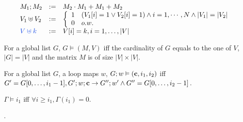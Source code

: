\documentclass[a4paper,11pt]{article}
\begin{document}
\[
\begin{array}{lll}
M_1 ; M_2 & := & M_2 \cdot M_1 + M_1 + M_2      \\
V_1 \uplus V_2 & := & \left\{
\begin{array}{ll}
1 & (V_1[i] = 1 \lor V_2[i] = 1) \land i = 1, \cdots, N \land |V_1| = |V_2|\\
0 & o.w.
\end{array}\right.
\\
\jl{V \uplus k} & := & V[i] = k , i = 1, \ldots, |V|    \\
\end{array}
\]


\begin{defn}
For a global list $G$, $G \vDash (M,V)$ iff the cardinality of $G$ equals to the one of $V$, $|G| = |V|$ and the matrix $M$ is of size $|V| \times |V|$.
\end{defn}

\begin{defn}
For a global list $G$, a loop maps $w$, $G;w \vDash (\mathbf{{c}},i_1,i_2)$ iff $G' = G[0,\ldots, i_1-1], G';w; \mathbf{{c}} \to G'' ; w' \land G'' = G[0, \ldots, i_2-1] $.  
\end{defn}

\begin{defn}
$\Gamma \vDash i_1$ iff $\forall i \geq i_1, \Gamma(i_1)=0 $.  
\end{defn}


\begin{defn}
.
\\
 \end{defn}  
     
%
\end{document}
